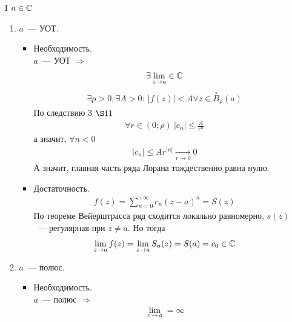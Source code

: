 \pr
\begin{itemize}
    \item[I] $a \in \mathbb{C}$
    \begin{enumerate}
        \item $a$~--- УОТ.
        \begin{itemize}
            \item Необходимость.
            \\
            $a$~--- УОТ $\Rightarrow$
            \begin{align*}
              \exists \lim_{z \to a} \in \mathbb{C}
            \end{align*}
            \begin{align*}
              \exists \rho > 0, \exists A > 0: \ \left| f(z) \right| < A \forall z \in \overset{\circ}{B}_{\rho}(a)
            \end{align*}
            По следствию $3$ $\S 11$
            \begin{align*}
               \forall r \in (0;\rho) \ \left| c_n \right| \leq \frac{A}{r^n}
            \end{align*}
            а значит, $\forall n < 0$
            \begin{align*}
              \left| c_n \right| \leq Ar^{\left| n \right|} \underset{r\to 0}{\longrightarrow} 0
            \end{align*}
            А значит, главная часть ряда Лорана тождественно равна нулю.
            \item Достаточность.
            \begin{align*}
              f(z) = \sum_{n=0}^{+\infty}c_n(z-a)^n = S(z)
            \end{align*}
            По теореме Вейерштрасса ряд сходится локально равномерно, $s(z)$~---
            регулярная при $z \neq a$. Но тогда
            \begin{align*}
              \lim_{z \to a}f(z) = \lim_{z \to a}S_n(z) = S(a) = c_0 \in \mathbb{C}
            \end{align*}
        \end{itemize}
        \item $a$~--- полюс.
        \begin{itemize}
            \item Необходимость.
            \\
            $a$~--- полюс $\Rightarrow$
            \begin{align*}
              \lim_{z \to a} = \infty
            \end{align*}

\end{itemize}
\end{enumerate}
\end{itemize}
